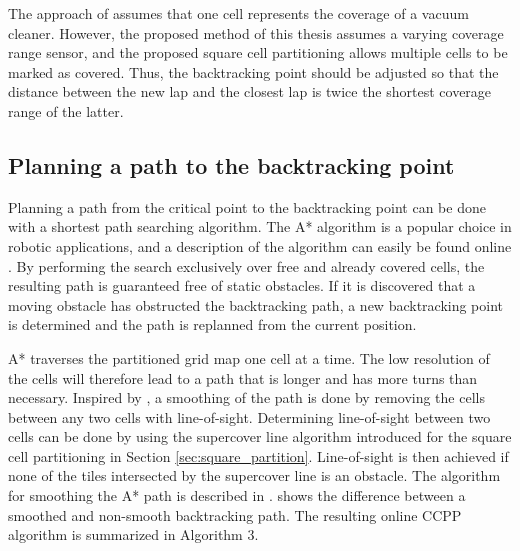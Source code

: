 The approach of \citet{Viet2013} assumes that one cell represents the coverage of a vacuum cleaner. However, the proposed method of this thesis assumes a varying coverage range sensor, and the proposed square cell partitioning allows multiple cells to be marked as covered. Thus, the backtracking point should be adjusted so that the distance between the new lap and the closest lap is twice the shortest coverage range of the latter.

\subsection{Planning a path to the backtracking point}

Planning a path from the critical point to the backtracking point can be done with a shortest path searching algorithm. The A* algorithm is a popular choice in robotic applications, and a description of the algorithm can easily be found online \citep{wiki:a_star}. By performing the search exclusively over free and already covered cells, the resulting path is guaranteed free of static obstacles. If it is discovered that a moving obstacle has obstructed the backtracking path, a new backtracking point is determined and the path is replanned from the current position. 

A* traverses the partitioned grid map one cell at a time. The low resolution of the cells will therefore lead to a path that is longer and has more turns than necessary. Inspired by \citet{Viet2013}, a smoothing of the path is done by removing the cells between any two cells with line-of-sight. Determining line-of-sight between two cells can be done by using the supercover line algorithm introduced for the square cell partitioning in Section \ref{sec:square_partition}. Line-of-sight is then achieved if none of the tiles intersected by the supercover line is an obstacle. The algorithm for smoothing the A* path is described in \citet{Viet2013}.  shows the difference between a smoothed and non-smooth backtracking path. The resulting online CCPP algorithm is summarized in Algorithm 3.


